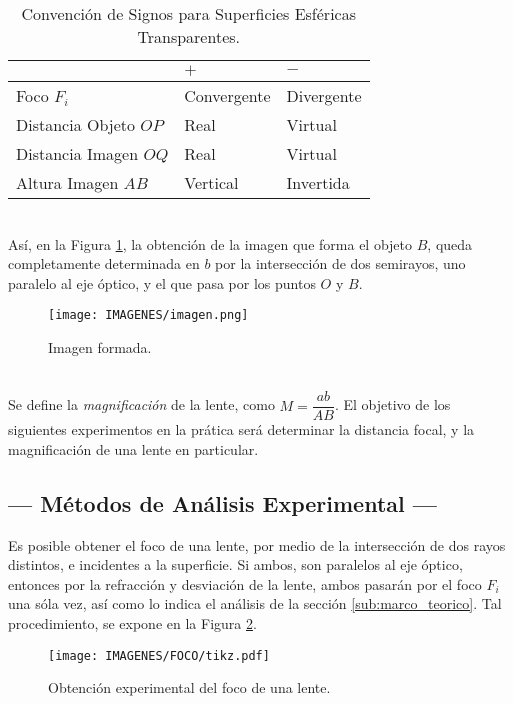 \documentclass[10pt,a4paper]{article}
\begin{document}
\begin{table}[ht]
	\centering
	\caption{Convención de Signos para Superficies Esféricas Transparentes.}
	\begin{tabular}{|l|l|l|}
		\hline 
		& \hspace{7mm} \(+\) & \hspace{7mm} \(-\) \\ \hline
		Foco \(F_i\) & Convergente & Divergente \\ \hline
		Distancia Objeto \(OP\) & Real & Virtual \\ \hline
		Distancia Imagen \(OQ\) & Real & Virtual \\ \hline
		Altura Imagen \(AB\)& Vertical & Invertida \\ \hline
	\end{tabular}
	\label{tab:convencion_signos}
\end{table}\\
Así, en la Figura \ref{fig:imagen}, la obtención de la imagen que forma el objeto \(B\), queda completamente determinada en \(b\) por la intersección de dos semirayos, uno paralelo al eje óptico, y el que pasa por los puntos \(O\) y \(B\).
\begin{figure}[ht]
	\centering
	\texttt{[image: IMAGENES/imagen.png]}
	\caption{Imagen formada.}
	\label{fig:imagen}
\end{figure}\\
Se define la \textit{magnificación} de la lente, como \(M = \dfrac{ab}{AB}\).
El objetivo de los siguientes experimentos en la prática será determinar la distancia focal, y la magnificación de una lente en particular.

\subsection{--- Métodos de Análisis Experimental ---} %
\label{sub:analisis_exp}
Es posible obtener el foco de una lente, por medio de la intersección de dos rayos distintos, e incidentes a la superficie. Si ambos, son paralelos al eje óptico, entonces por la refracción y desviación de la lente, ambos pasarán por el foco \(F_i\) una sóla vez, así como lo indica el análisis de la sección \ref{sub:marco_teorico}. Tal procedimiento, se expone en la Figura \ref{fig:foco}.
\begin{figure}[ht]
	\centering
	\texttt{[image: IMAGENES/FOCO/tikz.pdf]}
	\caption{Obtención experimental del foco de una lente.}
	\label{fig:foco}
\end{figure}
\end{document}
